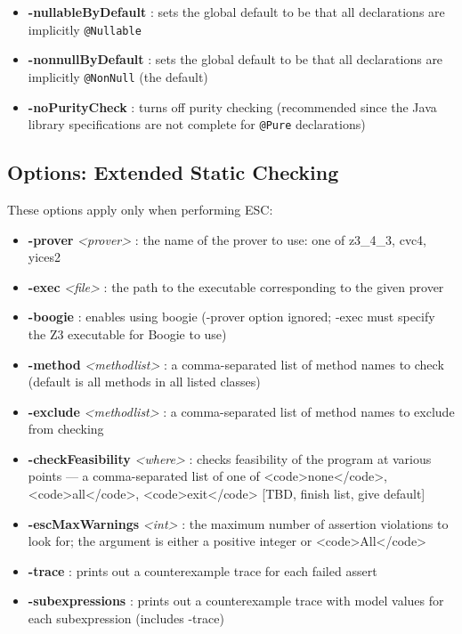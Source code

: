 \documentclass{report}%
\begin{document}
\begin{itemize}
\item \textbf{-nullableByDefault} : sets the global default to be that all declarations are implicitly \texttt{@Nullable}
\item \textbf{-nonnullByDefault} : sets the global default to be that all 
declarations are implicitly \texttt{@NonNull} (the default)
\item \textbf{-noPurityCheck} : turns off purity checking (recommended since the Java library specifications are not complete for \texttt{@Pure} declarations)
\end{itemize}

\subsection{Options: Extended Static Checking}

These options apply only when performing ESC:
\begin{itemize}
\item \textbf{-prover} \textit{<prover>} : the name of the prover to use: one of z3\_4\_3, cvc4, yices2
\item \textbf{-exec} \textit{<file>} : the path to the executable corresponding to the given prover
\item \textbf{-boogie} : enables using boogie (-prover option ignored; -exec must specify the Z3 executable for Boogie to use)
\item \textbf{-method} \textit{<methodlist>} : a comma-separated list of method names to
check (default is all methods in all listed classes)
\item \textbf{-exclude} \textit{<methodlist>} : a comma-separated list of method names to exclude from checking
\item \textbf{-checkFeasibility} \textit{<where>} : checks feasibility of the program at various points --- a comma-separated list of
one of <code>none</code>, <code>all</code>, <code>exit</code> [TBD, finish list,  give default]
\item \textbf{-escMaxWarnings} \textit{<int>} : the maximum number of assertion violations to look for; the argument is either a positive integer or <code>All</code>
\item \textbf{-trace} : prints out a counterexample trace for each failed assert
\item \textbf{-subexpressions} : prints out a counterexample trace with model values for each subexpression (includes -trace)
\end{itemize}
\end{document}
